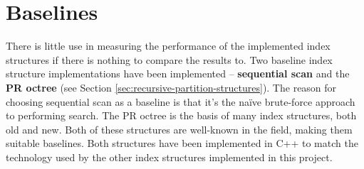 \begin{table}
	\centering
	\caption{Evaluation Datasets}
	\label{tab:operation-lists}
\end{table}

\section{Baselines}
\label{sec:baselines}

There is little use in measuring the performance of the implemented index structures if there is nothing to compare the results to. Two baseline index structure implementations have been implemented -- \textbf{sequential scan} and the \textbf{PR octree} (see Section \ref{sec:recursive-partition-structures}). The reason for choosing sequential scan as a baseline is that it's the na\"{i}ve brute-force approach to performing search. The PR octree is the basis of many index structures, both old and new. Both of these structures are well-known in the field, making them suitable baselines. Both structures have been implemented in C++ to match the technology used by the other index structures implemented in this project.

